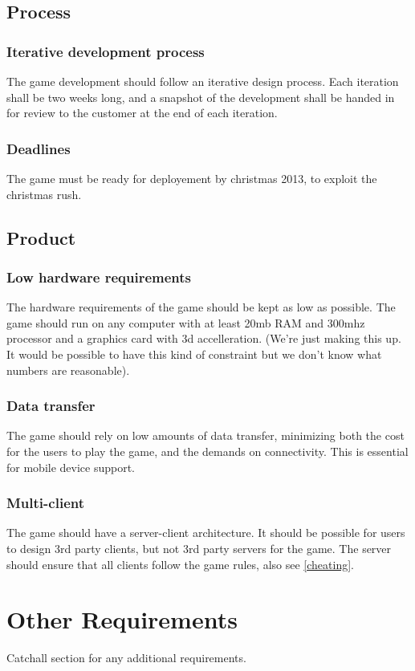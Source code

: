 \documentclass[a4paper,10pt]{article}
\begin{document}
\subsection{Process}
\subsubsection{Iterative development process}
The game development should follow an iterative design process. Each iteration shall be two weeks long, and a snapshot of the development shall be handed in for review to the customer at the end of each iteration.

\subsubsection{Deadlines}
The game must be ready for deployement by christmas 2013, to exploit the christmas rush.

\subsection{Product}
\subsubsection{Low hardware requirements}
\label{hwreq}
The hardware requirements of the game should be kept as low as possible. The game should run on any computer with at least 20mb RAM and 300mhz processor and a graphics card with 3d accelleration. (We're just making this up. It would be possible to have this kind of constraint but we don't know what numbers are reasonable).

\subsubsection{Data transfer}
The game should rely on low amounts of data transfer, minimizing both the cost for the users to play the game, and the demands on connectivity. This is essential for mobile device support.

\subsubsection{Multi-client}
The game should have a server-client architecture. It should be possible for users to design 3rd party clients, but not 3rd party servers for the game. The server should ensure that all clients follow the game rules, also see \ref{cheating}.

\section{Other Requirements}
Catchall section for any additional requirements.
\end{document}
